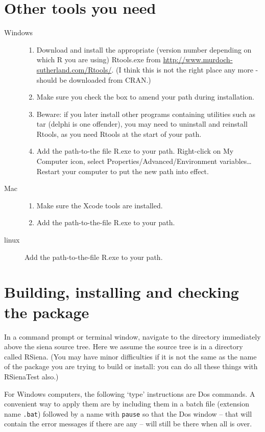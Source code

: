 \documentclass[a4paper,fleqn,11pt]{article}
\newcommand{\+}{\, + \,}
\newcommand{\sfn}[1]{\textsf{#1}}
\newcommand{\R}{{\sf R }}
\begin{document}
{\section{Other tools you need}
\begin{description}
\item[Windows]
\begin{enumerate}
\item Download and install the appropriate (version number
  depending on which \R you are using)
\textsf{Rtools.exe} from
  \url{http://www.murdoch-sutherland.com/Rtools/}.
  (I think this is not the right place any more - should be downloaded from CRAN.)
\item Make sure you check the box to amend your path during installation.
\item Beware: if you later install
  other programs containing utilities such as tar (delphi is one offender),
  you may need to uninstall and reinstall Rtools, as you need Rtools
  at the start of your path.
\item Add the path-to-the file
 R.exe to your path. Right-click on My Computer icon,
  select Properties/Advanced/Environment variables\ldots   \\
 Restart your computer to put the new path into effect.
\end{enumerate}
\item[Mac]
\begin{enumerate}
\item Make sure the Xcode tools are installed.
\item Add the path-to-the-file R.exe to your path.
\end{enumerate}
\item[linux]
 Add the path-to-the-file R.exe to your path.
\end{description}

\section{Building, installing and checking the package}
In a command prompt or terminal window, navigate to the directory
immediately above the
siena source tree. Here we assume the source tree is in a directory
called \sfn{RSiena}. (You may have minor
difficulties if it is not the same as the name of the package you are trying to
build or install: you can do all these things with \sfn{RSienaTest} also.)

For Windows computers, the following `type' instructions are Dos commands.
A convenient way to apply them are by including them in a batch
file (extension name \texttt{.bat}) followed by a name with \verb|pause|
so that the Dos window -- that will contain the error messages
if there are any -- will still be there when all is over.

}
\end{document}
